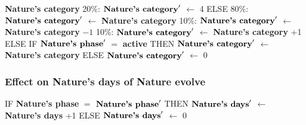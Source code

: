 \documentclass{article}%
\begin{document}
\begin{flushleft}
\textbf{Nature's category}%
\linebreak%
\hspace*{10em}%
20\%: %
$\mbox{\textbf{Nature's category}} '$%
$\leftarrow$%
4%
\linebreak%
\hspace*{8em}%
ELSE %
\linebreak%
\hspace*{10em}%
80\%: %
$\mbox{\textbf{Nature's category}} '$%
$\leftarrow$%
\textbf{Nature's category}%
\linebreak%
\hspace*{10em}%
10\%: %
$\mbox{\textbf{Nature's category}} '$%
$\leftarrow$%
\textbf{Nature's category}%
${-}1$%
\linebreak%
\hspace*{10em}%
10\%: %
$\mbox{\textbf{Nature's category}} '$%
$\leftarrow$%
\textbf{Nature's category}%
+1%
\linebreak%
\hspace*{2em}%
ELSE %
IF %
$\mbox{\textbf{Nature's phase}} '$%
$=$%
\textbf{active}%
\linebreak%
\hspace*{4em}%
THEN %
$\mbox{\textbf{Nature's category}} '$%
$\leftarrow$%
\textbf{Nature's category}%
\linebreak%
\hspace*{4em}%
ELSE %
$\mbox{\textbf{Nature's category}} '$%
$\leftarrow$%
0%
\end{flushleft}

%
\subsubsection{Effect on Nature's days of Nature evolve}%
\label{ssubsec:Effect on Nature's days of Nature evolve}%
\begin{flushleft}%
IF %
\textbf{Nature's phase}%
$=$%
$\mbox{\textbf{Nature's phase}} '$%
\linebreak%
\hspace*{2em}%
THEN %
$\mbox{\textbf{Nature's days}} '$%
$\leftarrow$%
\textbf{Nature's days}%
+1%
\linebreak%
\hspace*{2em}%
ELSE %
$\mbox{\textbf{Nature's days}} '$%
$\leftarrow$%
0%
\end{flushleft}

%
\end{document}
